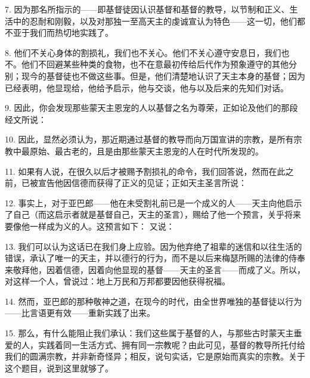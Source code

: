 7. 因为那名所指示的——即基督徒因认识基督和基督的教导，以节制和正义、生活中的忍耐和刚毅，以及对那独一至高天主的虔诚宣认为特色——这一切，他们都不亚于我们而热切地实践了。\par

8. 他们不关心身体的割损礼，我们也不关心。他们不关心遵守安息日，我们也不。他们不回避某些种类的食物，也不在意最初传给后代作为预象遵守的其他分别；现今的基督徒也不做这些事。但是，他们清楚地认识了天主本身的基督；因为已经表明，他显现给，他给予启示，他与交谈，他与以及后来的先知们对话。\par

9. 因此，你会发现那些蒙天主恩宠的人以基督之名为尊荣，正如论及他们的那段经文所说：\par

10. 因此，显然必须认为，那近期通过基督的教导而向万国宣讲的宗教，是所有宗教中最原始、最古老的，且是由那些蒙天主恩宠的人在时代所发现的。\par

11. 如果有人说，在很久以后才被赐予割损礼的命令，我们回答说，然而在此之前，已被宣告他因信德而获得了正义的见证；正如天主圣言所说：\par

12. 事实上，对于亚巴郎——他在未受割礼前已是一个成义的人——天主向他启示了自己（而这启示者就是基督自己，天主的圣言），赐给了他一个预言，关乎将来要像他一样成为义的人。这预言如下： 又说：\par

13. 我们可以认为这话已在我们身上应验。因为他弃绝了祖辈的迷信和以往生活的错误，承认了唯一的天主，并以德行的行为，而不是以后来梅瑟所赐的法律的侍奉来敬拜他，因着信德，因着向他显现的基督——天主的圣言——而成了义。所以，对这样一个人，曾说过：地上万民和万邦都要因他获得祝福。\par

14. 然而，亚巴郎的那种敬神之道，在现今的时代，由全世界唯独的基督徒以行为——比言语更有效——重新实践了出来。\par

15. 那么，有什么能阻止我们承认：我们这些属于基督的人，与那些古时蒙天主垂爱的人，实践着同一生活方式、拥有同一宗教呢？由此可见，基督的教导所托付给我们的圆满宗教，并非新奇怪异；相反，说句实话，它是原始而真实的宗教。关于这个题目，说到这里就够了。\par

